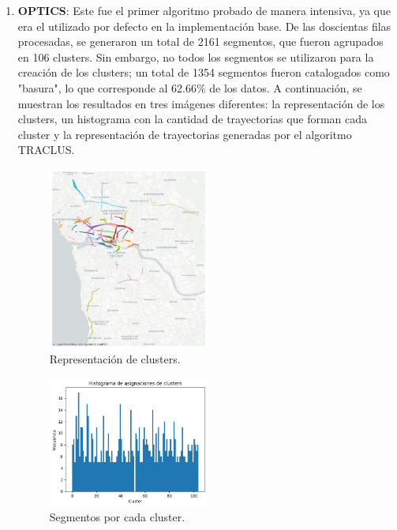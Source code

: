 \begin{enumerate}

\item \textbf{OPTICS}:  
Este fue el primer algoritmo probado de manera intensiva, ya que era el utilizado por defecto en la implementación base. De las doscientas filas procesadas, se generaron un total de 2161 segmentos, que fueron agrupados en 106 clusters. Sin embargo, no todos los segmentos se utilizaron para la creación de los clusters; un total de 1354 segmentos fueron catalogados como "basura", lo que corresponde al 62.66\% de los datos. A continuación, se muestran los resultados en tres imágenes diferentes: la representación de los clusters, un histograma con la cantidad de trayectorias que forman cada cluster y la representación de trayectorias generadas por el algoritmo TRACLUS.

\begin{figure}[h!]
    \centering
    \includegraphics[width=0.5\textwidth]{img/clusters_OPTICS.png}
    \caption{Representación de clusters.}
    \label{fig:clusters_OPTICS}
\end{figure}

\begin{figure}[h!]
    \centering
    \includegraphics[width=0.5\textwidth]{img/histograma_OPTICS.png}
    \caption{Segmentos por cada cluster.}
    \label{fig:histograma_OPTICS}
\end{figure}


\end{enumerate}
